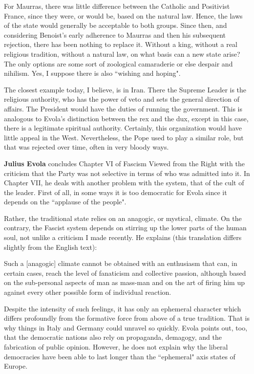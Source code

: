 For Maurras, there was little difference between the Catholic and Positivist France, since they were, or would be, based on the natural law. Hence, the laws of the state would generally be acceptable to both groups. Since then, and considering Benoist's early adherence to Maurras and then his subsequent rejection, there has been nothing to replace it. Without a king, without a real religious tradition, without a natural law, on what basis can a new state arise? The only options are some sort of zoological camaraderie or else despair and nihilism. Yes, I suppose there is also ``wishing and hoping".

The closest example today, I believe, is in Iran. There the Supreme Leader is the religious authority, who has the power of veto and sets the general direction of affairs. The President would have the duties of running the government. This is analogous to Evola's distinction between the rex and the dux, except in this case, there is a legitimate spiritual authority. Certainly, this organization would have little appeal in the West. Nevertheless, the Pope used to play a similar role, but that was rejected over time, often in very bloody ways.


\hfill

\textbf{Julius Evola} concludes Chapter VI of Fascism Viewed from the Right with the criticism that the Party was not selective in terms of who was admitted into it. In Chapter VII, he deals with another problem with the system, that of the cult of the leader. First of all, in some ways it is too democratic for Evola since it depends on the ``applause of the people".

Rather, the traditional state relies on an anagogic, or mystical, climate. On the contrary, the Fascist system depends on stirring up the lower parts of the human soul, not unlike a criticism I made recently. He explains (this translation differs slightly from the English text):

\begin{quotex}
Such a [anagogic] climate cannot be obtained with an enthusiasm that can, in certain cases, reach the level of fanaticism and collective passion, although based on the sub-personal aspects of man as mass-man and on the art of firing him up against every other possible form of individual reaction. 

\end{quotex}
Despite the intensity of such feelings, it has only an ephemeral character which differs profoundly from the formative force from above of a true tradition. That is why things in Italy and Germany could unravel so quickly. Evola points out, too, that the democratic nations also rely on propaganda, demagogy, and the fabrication of public opinion. However, he does not explain why the liberal democracies have been able to last longer than the ``ephemeral" axis states of Europe.

